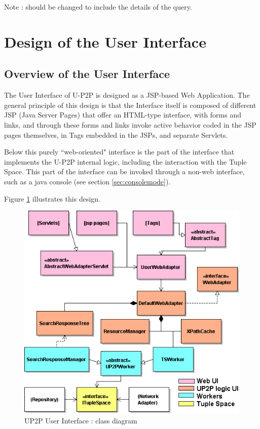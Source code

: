 \documentclass[titlepage]{article}%
\begin{document}
Note : should be changed to include the details of the query.



\section{Design of the User Interface}
\label{sec:UIDesign}

\subsection{Overview of the User Interface}

The User Interface of U-P2P is designed as a JSP-based Web Application. The general principle of this design is that the Interface itself is composed of different JSP (Java Server Pages) that offer an HTML-type interface, with forms and links, and through these forms and links invoke active behavior coded in the JSP pages themselves, in Tags embedded in the JSPs, and separate Servlets.

Below this purely ``web-oriented" interface is the part of the interface that implements the U-P2P internal logic, including the interaction with the Tuple Space. This part of the interface can be invoked through a non-web interface, such as a java console (see section \ref{sec:consolemode}). 

Figure \ref{fig:UIOverviewClasses} illustrates this design.

\begin{figure}[htb]
\centering
	\includegraphics[scale=0.5]{diagrams/UP2PUserInterfaceClassesColor.png}
	\caption{UP2P User Interface : class diagram}
	\label{fig:UIOverviewClasses}
\end{figure}
\end{document}

